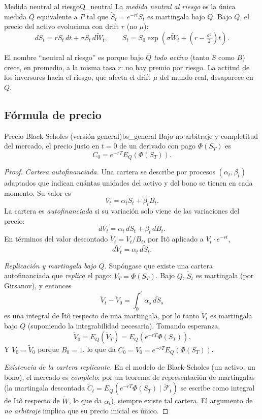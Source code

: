\documentclass[11pt, a4paper]{article}
\begin{document}
\begin{definicion}{Medida neutral al riesgo}{Q_neutral}
La \emph{medida neutral al riesgo} es la única medida $Q$ equivalente a $P$ tal que
$\widetilde{S}_t = e^{-rt} S_t$ es martingala bajo $Q$. Bajo $Q$, el precio del activo evoluciona
con drift $r$ (no $\mu$):
$$ dS_t = r S_t \, dt + \sigma S_t \, d\widetilde{W}_t, \qquad S_t = S_0 \exp\!\left(\sigma
\widetilde{W}_t + (r - \tfrac{\sigma^2}{2}) t\right). $$
\end{definicion}

\obs El nombre ``neutral al riesgo'' es porque bajo $Q$ \emph{todo activo} (tanto $S$ como $B$)
crece, en promedio, a la misma tasa $r$: no hay premio por riesgo. La actitud de los inversores
hacia el riesgo, que afecta el drift $\mu$ del mundo real, desaparece en $Q$.

\subsection{Fórmula de precio}

\begin{teorema}{Precio Black-Scholes (versión general)}{bs_general}
Bajo no arbitraje y completitud del mercado, el precio justo en $t = 0$ de un derivado con pago
$\Phi(S_T)$ es
$$ C_0 = e^{-rT} E_Q(\Phi(S_T)). $$
\end{teorema}

\begin{proof}
\textit{Cartera autofinanciada.} Una cartera se describe por procesos $(\alpha_t, \beta_t)$
adaptados que indican cuántas unidades del activo y del bono se tienen en cada momento. Su valor
es
$$ V_t = \alpha_t S_t + \beta_t B_t. $$
La cartera es \emph{autofinanciada} si su variación solo viene de las variaciones del precio:
$$ dV_t = \alpha_t \, dS_t + \beta_t \, dB_t. $$
En términos del valor descontado $\widetilde{V}_t = V_t / B_t$, por Itô aplicado a
$V_t \cdot e^{-rt}$,
$$ d\widetilde{V}_t = \alpha_t \, d\widetilde{S}_t. $$

\textit{Replicación y martingala bajo $Q$.} Supóngase que existe una cartera autofinanciada que
\emph{replica} el pago: $V_T = \Phi(S_T)$. Bajo $Q$, $\widetilde{S}_t$ es martingala (por
Girsanov), y entonces
$$ \widetilde{V}_t - \widetilde{V}_0 = \int_0^t \alpha_s \, d\widetilde{S}_s $$
es una integral de Itô respecto de una martingala, por lo tanto $\widetilde{V}_t$ es martingala
bajo $Q$ (suponiendo la integrabilidad necesaria). Tomando esperanza,
$$ \widetilde{V}_0 = E_Q(\widetilde{V}_T) = E_Q(e^{-rT} \Phi(S_T)). $$
Y $V_0 = \widetilde{V}_0$ porque $B_0 = 1$, lo que da $C_0 = V_0 = e^{-rT} E_Q(\Phi(S_T))$.

\textit{Existencia de la cartera replicante.} En el modelo de Black-Scholes (un activo, un bono),
el mercado es \emph{completo}: por un teorema de representación de martingalas (la martingala
descontada $\widetilde{C}_t = E_Q(e^{-rT} \Phi(S_T) \mid \widetilde{\mathcal{F}}_t)$ se escribe como
integral de Itô respecto de $\widetilde{W}$, lo que da $\alpha_t$), siempre existe tal cartera.
El argumento de \emph{no arbitraje} implica que su precio inicial es único.
\end{proof}
\end{document}
